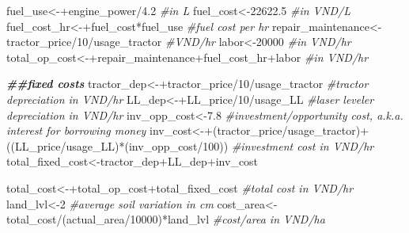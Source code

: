 \documentclass[
]{article}
\newenvironment{Shaded}{\begin{snugshade}}{\end{snugshade}}
\newcommand{\CommentTok}[1]{\textcolor[rgb]{0.56,0.35,0.01}{\textit{#1}}}
\newcommand{\DecValTok}[1]{\textcolor[rgb]{0.00,0.00,0.81}{#1}}
\newcommand{\DocumentationTok}[1]{\textcolor[rgb]{0.56,0.35,0.01}{\textbf{\textit{#1}}}}
\newcommand{\FloatTok}[1]{\textcolor[rgb]{0.00,0.00,0.81}{#1}}
\newcommand{\NormalTok}[1]{#1}
\newcommand{\OtherTok}[1]{\textcolor[rgb]{0.56,0.35,0.01}{#1}}
\newcommand{\SpecialCharTok}[1]{\textcolor[rgb]{0.00,0.00,0.00}{#1}}
\begin{document}
\begin{Shaded}
\begin{Highlighting}[]
\NormalTok{fuel\_use}\OtherTok{\textless{}{-}}\SpecialCharTok{+}\NormalTok{engine\_power}\SpecialCharTok{/}\FloatTok{4.2} \CommentTok{\#in L}
\NormalTok{fuel\_cost}\OtherTok{\textless{}{-}}\FloatTok{22622.5} \CommentTok{\#in VND/L}
\NormalTok{fuel\_cost\_hr}\OtherTok{\textless{}{-}}\SpecialCharTok{+}\NormalTok{fuel\_cost}\SpecialCharTok{*}\NormalTok{fuel\_use }\CommentTok{\#fuel cost per hr}
\NormalTok{repair\_maintenance}\OtherTok{\textless{}{-}}\NormalTok{tractor\_price}\SpecialCharTok{/}\DecValTok{10}\SpecialCharTok{/}\NormalTok{usage\_tractor }\CommentTok{\#VND/hr}
\NormalTok{labor}\OtherTok{\textless{}{-}}\DecValTok{20000} \CommentTok{\#in VND/hr}
\NormalTok{total\_op\_cost}\OtherTok{\textless{}{-}}\SpecialCharTok{+}\NormalTok{repair\_maintenance}\SpecialCharTok{+}\NormalTok{fuel\_cost\_hr}\SpecialCharTok{+}\NormalTok{labor }\CommentTok{\#in VND/hr}

\DocumentationTok{\#\#fixed costs}
\NormalTok{tractor\_dep}\OtherTok{\textless{}{-}}\SpecialCharTok{+}\NormalTok{tractor\_price}\SpecialCharTok{/}\DecValTok{10}\SpecialCharTok{/}\NormalTok{usage\_tractor }\CommentTok{\#tractor depreciation in VND/hr}
\NormalTok{LL\_dep}\OtherTok{\textless{}{-}}\SpecialCharTok{+}\NormalTok{LL\_price}\SpecialCharTok{/}\DecValTok{10}\SpecialCharTok{/}\NormalTok{usage\_LL }\CommentTok{\#laser leveler depreciation in VND/hr}
\NormalTok{inv\_opp\_cost}\OtherTok{\textless{}{-}}\FloatTok{7.8} \CommentTok{\#investment/opportunity cost, a.k.a. interest for borrowing money}
\NormalTok{inv\_cost}\OtherTok{\textless{}{-}}\SpecialCharTok{+}\NormalTok{(tractor\_price}\SpecialCharTok{/}\NormalTok{usage\_tractor)}\SpecialCharTok{+}\NormalTok{((LL\_price}\SpecialCharTok{/}\NormalTok{usage\_LL)}\SpecialCharTok{*}\NormalTok{(inv\_opp\_cost}\SpecialCharTok{/}\DecValTok{100}\NormalTok{)) }\CommentTok{\#investment cost in VND/hr}
\NormalTok{total\_fixed\_cost}\OtherTok{\textless{}{-}}\NormalTok{tractor\_dep}\SpecialCharTok{+}\NormalTok{LL\_dep}\SpecialCharTok{+}\NormalTok{inv\_cost}

\NormalTok{total\_cost}\OtherTok{\textless{}{-}}\SpecialCharTok{+}\NormalTok{total\_op\_cost}\SpecialCharTok{+}\NormalTok{total\_fixed\_cost }\CommentTok{\#total cost in VND/hr}
\NormalTok{land\_lvl}\OtherTok{\textless{}{-}}\DecValTok{2} \CommentTok{\#average soil variation in cm}
\NormalTok{cost\_area}\OtherTok{\textless{}{-}}\NormalTok{total\_cost}\SpecialCharTok{/}\NormalTok{(actual\_area}\SpecialCharTok{/}\DecValTok{10000}\NormalTok{)}\SpecialCharTok{*}\NormalTok{land\_lvl }\CommentTok{\#cost/area in VND/ha}


\end{Highlighting}
\end{Shaded}
\end{document}
